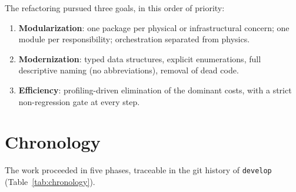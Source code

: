 \documentclass[11pt,a4paper]{article}
\newcommand{\code}[1]{\texttt{#1}}
\begin{document}
The refactoring pursued three goals, in this order of priority:
\begin{enumerate}
  \item \textbf{Modularization}: one package per physical or infrastructural concern;
        one module per responsibility; orchestration separated from physics.
  \item \textbf{Modernization}: typed data structures, explicit enumerations,
        full descriptive naming (no abbreviations), removal of dead code.
  \item \textbf{Efficiency}: profiling-driven elimination of the dominant costs,
        with a strict non-regression gate at every step.
\end{enumerate}

\section{Chronology}

The work proceeded in five phases, traceable in the git history of \code{develop}
(Table~\ref{tab:chronology}).
\end{document}
